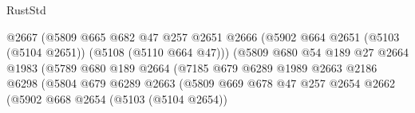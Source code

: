 \begin{lexlean}{RustStd}
\begin{coremodule}
                                            @2667
                                            (@5809
                                              @665
                                              @682
                                              @47
                                              @257
                                              @2651
                                              @2666
                                              (@5902
                                                @664
                                                @2651
                                                (@5103 (@5104 @2651))
                                                (@5108 (@5110 @664 @47)))
                                              (@5809
                                                @680
                                                @54
                                                @189
                                                @27
                                                @2664
                                                @1983
                                                (@5789
                                                  @680
                                                  @189
                                                  @2664
                                                  (@7185
                                                    @679
                                                    @6289
                                                    @1989
                                                    @2663
                                                    @2186
                                                    @6298
                                                    (@5804
                                                      @679
                                                      @6289
                                                      @2663
                                                      (@5809
                                                        @669
                                                        @678
                                                        @47
                                                        @257
                                                        @2654
                                                        @2662
                                                        (@5902
                                                          @668
                                                          @2654
                                                          (@5103 (@5104 @2654))

\end{coremodule}
\end{lexlean}
